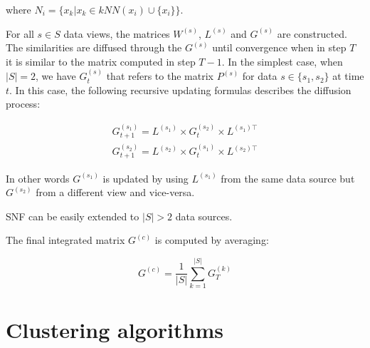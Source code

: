 where $N_i = \{ x_k | x_k \in kNN(x_i) \cup \{ x_i \}\}$.

For all $s\in S$ data views, the matrices $W^{(s)}$, $L^{(s)}$ and $G^{(s)}$ are constructed.  The similarities are diffused through the $G^{(s)}$ until convergence when in step $T$ it is similar to the matrix computed in step $T-1$.  
In the simplest case, when $|S|=2$, we have $G_t^{(s)}$ that refers to the matrix $P^{(s)}$ for data $s \in \{ s_1,s_2\}$ at time $t$.
In this case, the following recursive updating formulas describes the diffusion process:

\begin{equation}
    \label{eq:update}
    \begin{aligned}
        G^{(s_1)}_{t+1}=L^{(s_1)} \times G^{(s_2)}_{t} \times L^{(s_1)\top} \\
        G^{(s_2)}_{t+1}=L^{(s_2)} \times G^{(s_1)}_{t} \times L^{(s_2)\top}  
    \end{aligned}
\end{equation}

In other words $G^{(s_1)}$ is updated by using $L^{(s_1)}$ from the same data source but $G^{(s_2)}$ from a different view and vice-versa.

SNF can be easily extended to $|S| > 2$ data sources.

The final integrated matrix $G^{(c)}$ is computed by averaging:

\begin{equation}
    \label{eq:consensus}
    G^{(c)} = \frac{1}{|S|} \sum_{k=1}^{|S|} G_T^{(k)}
\end{equation}


\section{Clustering algorithms}